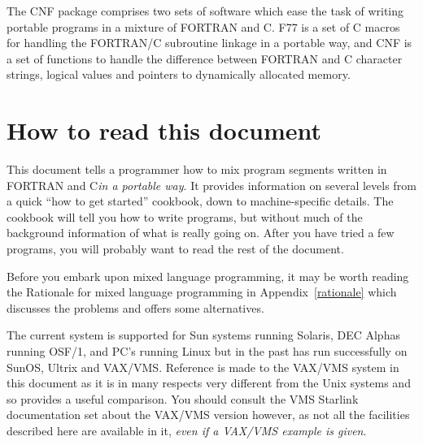 \documentclass[twoside,11pt]{article}
\makeatletter
\newcommand{\stardocinitials}  {SUN}
\newcommand{\stardocnumber}    {209.6}
\newcommand{\stardocabstract}  {
The CNF package comprises two sets of software which ease the task of writing
portable programs in a mixture of FORTRAN and C\@.
F77 is a set of C macros for handling the FORTRAN/C subroutine linkage in a 
portable way, and CNF is a set of functions to handle the difference between
FORTRAN and C character strings, logical values and pointers to
dynamically allocated memory.}
\newcommand{\stardocname}{\stardocinitials /\stardocnumber}
\newcommand{\htmlref}[2]{#1}
\newenvironment{latexonly}{}{}
\newcommand{\latex}[1]{#1}
\newcommand{\xlabel}[1]{}
\renewcommand{\_}{\texttt{\symbol{95}}}
\renewcommand{\thepage}{\roman{page}}
\makeatother
\begin{document}
\stardocabstract
  \newpage
  \begin{latexonly}
    \setlength{\parskip}{0mm}
    \tableofcontents
    \setlength{\parskip}{\medskipamount}
    \markboth{\stardocname}{\stardocname}
  \end{latexonly}
\cleardoublepage
\renewcommand{\thepage}{\arabic{page}}
\setcounter{page}{1}

\section{\xlabel{how_to_read_this_document}\label{how_to}How to read this document}

This document tells a programmer how to mix program segments written in FORTRAN
and C\@ \textit{in a portable way}. 
It provides information on several levels from a quick ``how to get
started'' cookbook, down to machine-specific details. 
The cookbook will tell you how to
write programs, but without much of the background information of what is
really going on. After you have tried a few programs, you will probably want to
read the rest of the document.

Before you embark upon mixed language programming, it may be worth reading the
\htmlref{Rationale for mixed language programming}{rationale}
\latex{ in Appendix~\ref{rationale}} which discusses the problems and 
offers some alternatives.

The current system is supported for Sun systems running Solaris, DEC Alphas 
running OSF/1, and PC's running Linux but in the past has run successfully on 
SunOS, Ultrix and VAX/VMS. 
Reference is made to the VAX/VMS system in this document as it is in
many respects very different from the Unix systems and so provides a useful
comparison. You should consult the VMS Starlink documentation set
about the VAX/VMS version however, as not all the facilities described here are 
available in it, \textit{even if a VAX/VMS example is given}.
\end{document}
